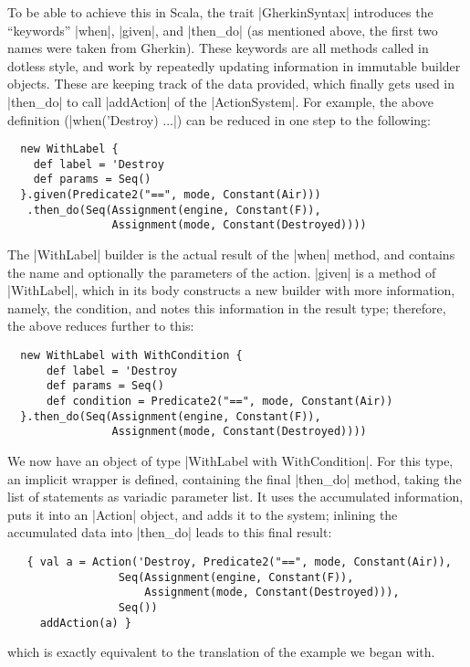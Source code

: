 To be able to achieve this in Scala, the trait |GherkinSyntax| introduces the \enquote{keywords}
|when|, |given|, and |then_do| (as mentioned above, the first two names were taken from
Gherkin). These keywords are all methods called in dotless style, and work by repeatedly updating
information in immutable builder objects. These are keeping track of the data provided, which
finally gets used in |then_do| to call |addAction| of the |ActionSystem|. For example, the above
definition (|when('Destroy) ...|) can be reduced in one step to the following:
\begin{lstlisting}
  new WithLabel {
    def label = 'Destroy
    def params = Seq()
  }.given(Predicate2("==", mode, Constant(Air)))
   .then_do(Seq(Assignment(engine, Constant(F)), 
                Assignment(mode, Constant(Destroyed))))
\end{lstlisting}
The |WithLabel| builder is the actual result of the |when| method, and contains the name and
optionally the parameters of the action. |given| is a method of |WithLabel|, which in its body
constructs a new builder with more information, namely, the condition, and notes this information in
the result type; therefore, the above reduces further to this:
\begin{lstlisting}
  new WithLabel with WithCondition {
      def label = 'Destroy
      def params = Seq()
      def condition = Predicate2("==", mode, Constant(Air))
  }.then_do(Seq(Assignment(engine, Constant(F)), 
                Assignment(mode, Constant(Destroyed))))
\end{lstlisting}
We now have an object of type |WithLabel with WithCondition|. For this type, an implicit wrapper is
defined, containing the final |then_do| method, taking the list of statements as variadic parameter
list. It uses the accumulated information, puts it into an |Action| object, and adds it to the
system; inlining the accumulated data into |then_do| leads to this final result:
\begin{lstlisting}
   { val a = Action('Destroy, Predicate2("==", mode, Constant(Air)), 
                 Seq(Assignment(engine, Constant(F)), 
                     Assignment(mode, Constant(Destroyed))), 
                 Seq())
     addAction(a) }
\end{lstlisting}
which is exactly equivalent to the translation of the example we began with.

